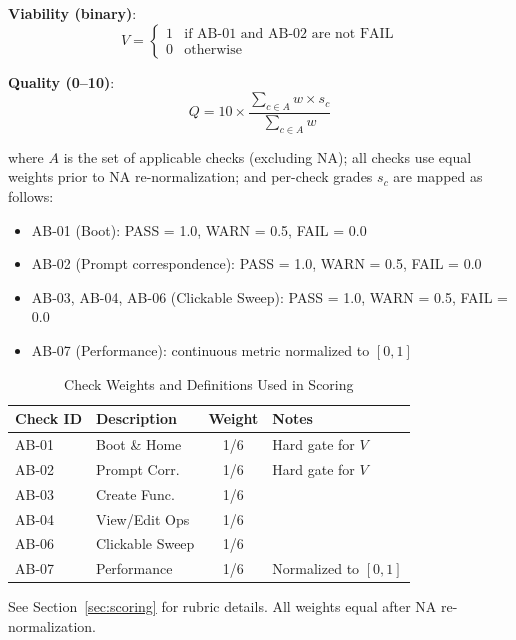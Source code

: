 \documentclass[conference]{IEEEtran}
\begin{document}
\textbf{Viability (binary)}:
\begin{equation}
V = \begin{cases}
1 & \text{if AB-01 and AB-02 are not FAIL} \\
0 & \text{otherwise}
\end{cases}
\end{equation}

\textbf{Quality (0--10)}:
\begin{equation}
Q = 10 \times \frac{\sum_{c \in A} w \times s_c}{\sum_{c \in A} w}
\end{equation}

where $A$ is the set of applicable checks (excluding NA); all checks use equal weights prior to NA re-normalization; and per-check grades $s_c$ are mapped as follows:
\begin{itemize}
\item AB-01 (Boot): PASS = 1.0, WARN = 0.5, FAIL = 0.0
\item AB-02 (Prompt correspondence): PASS = 1.0, WARN = 0.5, FAIL = 0.0
\item AB-03, AB-04, AB-06 (Clickable Sweep): PASS = 1.0, WARN = 0.5, FAIL = 0.0
\item AB-07 (Performance): continuous metric normalized to $[0,1]$
\end{itemize}

\begin{table}[!t]
\caption{Check Weights and Definitions Used in Scoring}
\label{tab:check-weights}
\centering
\small
\begin{threeparttable}
\begin{tabular}{@{}llcp{3cm}@{}}
\toprule
\textbf{Check ID} & \textbf{Description} & \textbf{Weight} & \textbf{Notes} \\
\midrule
AB-01 & Boot \& Home & 1/6 & Hard gate for $V$ \\
AB-02 & Prompt Corr. & 1/6 & Hard gate for $V$ \\
AB-03 & Create Func. & 1/6 &  \\
AB-04 & View/Edit Ops & 1/6 &  \\
AB-06 & Clickable Sweep & 1/6 &  \\
AB-07 & Performance & 1/6 & Normalized to $[0,1]$ \\
\bottomrule
\end{tabular}
\begin{tablenotes}\footnotesize
\item See Section~\ref{sec:scoring} for rubric details. All weights equal after NA re-normalization.
\end{tablenotes}
\end{threeparttable}
\end{table}
\end{document}
